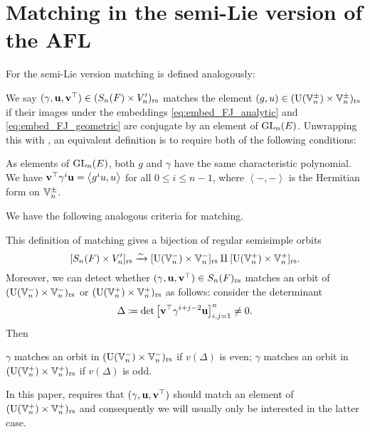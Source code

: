 \section{Matching in the semi-Lie version of the AFL}
For the semi-Lie version matching is defined analogously:
\begin{definition}
  We say $(\gamma, \mathbf u, \mathbf v^\top) \in (S_n(F) \times V_n')_{\mathrm{rs}}$
  matches the element $(g, u) \in (\operatorname{U}(\mathbb V_n^\pm) \times \mathbb V_n^\pm)_{\mathrm{rs}}$ if
  their images under the embeddings \eqref{eq:embed_FJ_analytic}
  and \eqref{eq:embed_FJ_geometric} are conjugate by an element of $\operatorname{GL}_n(E)$.
  Unwrapping this with ,
  an equivalent definition is to require both of the following conditions:
  \begin{itemize}
    \ii As elements of $\operatorname{GL}_n(E)$,
    both $g$ and $\gamma$ have the same characteristic polynomial.
    \ii We have $\mathbf v^\top \gamma^i \mathbf u = \left< g^i u, u \right>$ for all $0 \le i \le n-1$,
    where $\left< -,- \right>$ is the Hermitian form on $\mathbb V_n^\pm$.
  \end{itemize}
  \label{def:matching_semi_lie}
\end{definition}
We have the following analogous criteria for matching.
\begin{proposition}
  \label{prop:valuation_delta_matching_semilie}
  This definition of matching gives a bijection of regular semisimple orbits
  \[ [S_n(F) \times V_n']_{\mathrm{rs}} \xrightarrow{\sim} [\operatorname{U}(\mathbb V_n^-) \times \mathbb V_n^-]_{\mathrm{rs}} \amalg [\operatorname{U}(\mathbb V_n^+) \times \mathbb V_n^+]_{\mathrm{rs}}. \]
  Moreover, we can detect whether ${(\gamma, \mathbf u, \mathbf v^\top)} \in S_n(F)_{\mathrm{rs}}$ matches an orbit of
  $(\operatorname{U}(\mathbb V_n^-) \times \mathbb V_n^-)_{\mathrm{rs}}$ or $(\operatorname{U}(\mathbb V_n^+) \times \mathbb V_n^+)_{\mathrm{rs}}$ as follows:
  consider the determinant
  \[ \Delta \coloneqq \det \left[ \mathbf v^\top \gamma^{i+j-2} \mathbf u \right]_{i,j=1}^n \neq 0. \]
  Then
  \begin{itemize}
    \ii $\gamma$ matches an orbit in $(\operatorname{U}(\mathbb V_n^-) \times \mathbb V_n^-)_{\mathrm{rs}}$ if $v(\Delta)$ is even;
    \ii $\gamma$ matches an orbit in $(\operatorname{U}(\mathbb V_n^+) \times \mathbb V_n^+)_{\mathrm{rs}}$ if $v(\Delta)$ is odd.
  \end{itemize}
\end{proposition}
In this paper, 
requires that ${(\gamma, \mathbf u, \mathbf v^\top)}$ should match an element of $(\operatorname{U}(\mathbb V_n^+) \times \mathbb V_n^+)_{\mathrm{rs}}$
and consequently we will usually only be interested in the latter case.

